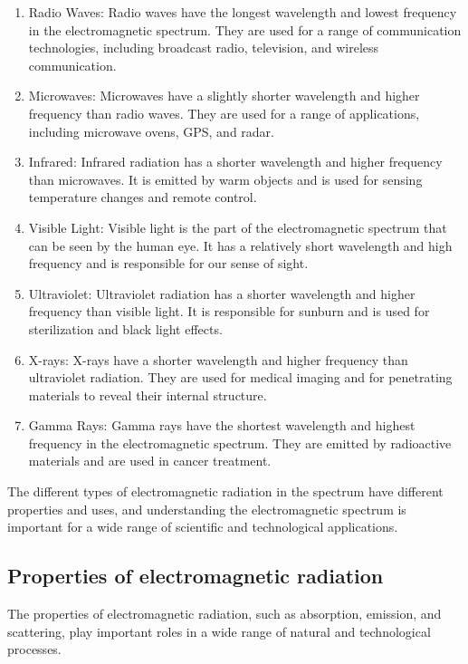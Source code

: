 \documentclass{article}
\begin{document}
\begin{enumerate}
\item Radio Waves: Radio waves have the longest wavelength and lowest frequency
  in the electromagnetic spectrum. They are used for a range of communication
  technologies, including broadcast radio, television, and wireless
  communication.
\item Microwaves: Microwaves have a slightly shorter wavelength and higher
  frequency than radio waves. They are used for a range of applications,
  including microwave ovens, GPS, and radar.

\item Infrared: Infrared radiation has a shorter wavelength and higher
  frequency than microwaves. It is emitted by warm objects and is used for
  sensing temperature changes and remote control.

\item Visible Light: Visible light is the part of the electromagnetic spectrum
  that can be seen by the human eye. It has a relatively short wavelength and
  high frequency and is responsible for our sense of sight.

\item Ultraviolet: Ultraviolet radiation has a shorter wavelength and higher
  frequency than visible light. It is responsible for sunburn and is used for
  sterilization and black light effects.

\item X-rays: X-rays have a shorter wavelength and higher frequency than
  ultraviolet radiation. They are used for medical imaging and for penetrating
  materials to reveal their internal structure.

\item Gamma Rays: Gamma rays have the shortest wavelength and highest frequency
  in the electromagnetic spectrum. They are emitted by radioactive materials
  and are used in cancer treatment.
\end{enumerate}

The different types of electromagnetic radiation in the spectrum have different
properties and uses, and understanding the electromagnetic spectrum is
important for a wide range of scientific and technological applications.
\subsection{Properties of electromagnetic radiation} %
\label{ssub:Properties of electromagnetic radiation}
The properties of electromagnetic radiation, such as absorption, emission, and
scattering, play important roles in a wide range of natural and technological
processes.
\end{document}
